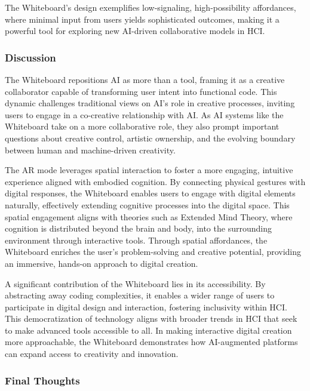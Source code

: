 The Whiteboard’s design exemplifies low-signaling, high-possibility affordances, where minimal input from users yields sophisticated outcomes, making it a powerful tool for exploring new AI-driven collaborative models in HCI.

\subsubsection{Discussion}

The Whiteboard repositions AI as more than a tool, framing it as a creative collaborator capable of transforming user intent into functional code.
This dynamic challenges traditional views on AI’s role in creative processes, inviting users to engage in a co-creative relationship with AI.
As AI systems like the Whiteboard take on a more collaborative role, they also prompt important questions about creative control, artistic ownership, and the evolving boundary between human and machine-driven creativity.

The AR mode leverages spatial interaction to foster a more engaging, intuitive experience aligned with embodied cognition.
By connecting physical gestures with digital responses, the Whiteboard enables users to engage with digital elements naturally, effectively extending cognitive processes into the digital space.
This spatial engagement aligns with theories such as Extended Mind Theory\cite{andy1998extended}, where cognition is distributed beyond the brain and body, into the surrounding environment through interactive tools.
Through spatial affordances, the Whiteboard enriches the user’s problem-solving and creative potential, providing an immersive, hands-on approach to digital creation.

A significant contribution of the Whiteboard lies in its accessibility.
By abstracting away coding complexities, it enables a wider range of users to participate in digital design and interaction, fostering inclusivity within HCI.
This democratization of technology aligns with broader trends in HCI that seek to make advanced tools accessible to all.
In making interactive digital creation more approachable, the Whiteboard demonstrates how AI-augmented platforms can expand access to creativity and innovation.

\subsubsection{Final Thoughts}

